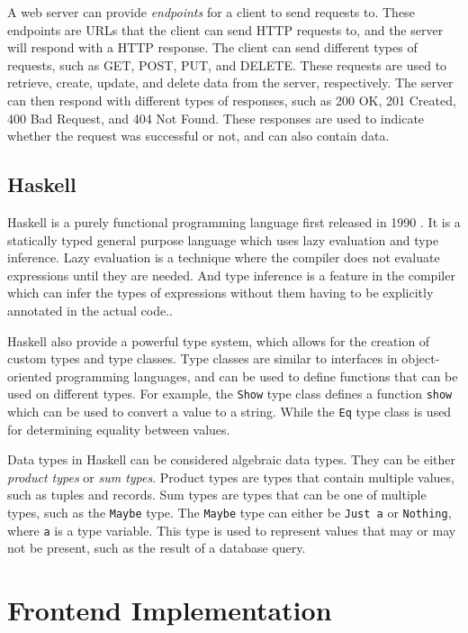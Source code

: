 \documentclass[11pt, a4paper]{article}
\begin{document}
A web server can provide \textit{endpoints} for a client to send requests to. These endpoints are URLs that the client can send HTTP requests to, and the server will respond with a HTTP response. The client can send different types of requests, such as GET, POST, PUT, and DELETE. These requests are used to retrieve, create, update, and delete data from the server, respectively. The server can then respond with different types of responses, such as 200 OK, 201 Created, 400 Bad Request, and 404 Not Found. These responses are used to indicate whether the request was successful or not, and can also contain data.

\subsection{Haskell}
\label{sec:haskell}
Haskell is a purely functional programming language first released in 1990 \cite{haskell}. It is a statically typed general purpose language which uses lazy evaluation and type inference. Lazy evaluation is a technique where the compiler does not evaluate expressions until they are needed. And type inference is a feature in the compiler which can infer the types of expressions without them having to be explicitly annotated in the actual code..

Haskell also provide a powerful type system, which allows for the creation of custom types and type classes. Type classes are similar to interfaces in object-oriented programming languages, and can be used to define functions that can be used on different types. For example, the \texttt{Show} type class defines a function \texttt{show} which can be used to convert a value to a string. While the \texttt{Eq} type class is used for determining equality between values.

Data types in Haskell can be considered algebraic data types. They can be either \textit{product types} or \textit{sum types}. Product types are types that contain multiple values, such as tuples and records. Sum types are types that can be one of multiple types, such as the \texttt{Maybe} type. The \texttt{Maybe} type can either be \texttt{Just a} or \texttt{Nothing}, where \texttt{a} is a type variable. This type is used to represent values that may or may not be present, such as the result of a database query.

\newpage

\section{Frontend Implementation}
\label{sec:frontend}
\end{document}
